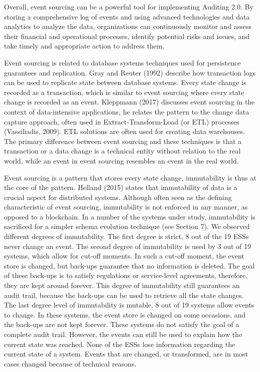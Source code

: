 Overall, event sourcing can be a powerful tool for implementing Auditing 2.0. By storing a comprehensive log of events and using advanced technologies and data analytics to analyze the data, organizations can continuously monitor and assess their financial and operational processes, identify potential risks and issues, and take timely and appropriate action to address them.

Event sourcing is related to database systems techniques used for persistence guarantees and replication. Gray and Reuter (1992) describe how transaction logs can be used to replicate state between database systems. Every state change is recorded as a transaction, which is similar to event sourcing where every state change is recorded as an event. Kleppmann (2017) discusses event sourcing in the context of data-intensive applications, he relates the pattern to the change data capture approach, often used in Extract-Transform-Load (or ETL) processes (Vassiliadis, 2009). ETL solutions are often used for creating data warehouses. The primary difference between event sourcing and these techniques is that a transaction or a data change is a technical entity without relation to the real world, while an event in event sourcing resembles an event in the real world.

Event sourcing is a pattern that stores every state change, immutability is thus at the core of the pattern. Helland (2015) states that immutability of data is a crucial aspect for distributed systems. Although often seen as the defining characteristic of event sourcing, immutability is not enforced in any manner, as opposed to a blockchain. In a number of the systems under study, immutability is sacrificed for a simpler schema evolution technique (see Section 7). We observed different degrees of immutability. The first degree is strict, 8 out of the 19 ESSs never change an event. The second degree of immutability is used by 3 out of 19 systems, which allow for cut-off moments. In such a cut-off moment, the event store is changed, but back-ups guarantee that no information is deleted. The goal of these back-ups is to satisfy regulations or service-level agreements, therefore, they are kept around forever. This degree of immutability still guarantees an audit trail, because the back-ups can be used to retrieve all the state changes. The last degree level of immutability is mutable, 8 out of 19 systems allow events to change. In these systems, the event store is changed on some occasions, and the back-ups are not kept forever. These systems do not satisfy the goal of a complete audit trail. However, the events can still be used to explain how the current state was reached. None of the ESSs lose information regarding the current state of a system. Events that are changed, or transformed, are in most cases changed because of technical reasons.

